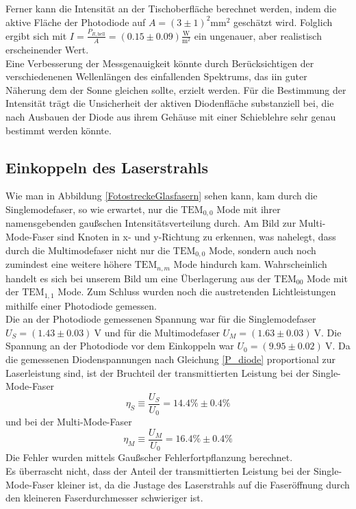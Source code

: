 \documentclass[11pt,a4paper,oneside]{scrartcl}
\begin{document}
Ferner kann die Intensität an der Tischoberfläche berechnet werden, indem die aktive Fläche der Photodiode auf $A=(3\pm1)^2\mathrm{mm}^2$ geschätzt wird. Folglich ergibt sich mit $I=\frac{P_{R,\mathrm{hell}}}{A}=(0.15\pm0.09)\frac{\mathrm{W}}{\mathrm m^2}$ ein ungenauer, aber realistisch erscheinender Wert. \\
Eine Verbesserung der Messgenauigkeit könnte durch Berücksichtigen der verschiedenenen Wellenlängen des einfallenden Spektrums, das iin guter Näherung dem der Sonne gleichen sollte, erzielt werden. Für die Bestimmung der Intensität trägt die Unsicherheit der aktiven Diodenfläche substanziell bei, die nach Ausbauen der Diode aus ihrem Gehäuse mit einer Schieblehre sehr genau bestimmt werden könnte.
\subsection{Einkoppeln des Laserstrahls}
Wie man in Abbildung \ref{FotostreckeGlasfasern} sehen kann, kam durch die Singlemodefaser, so wie erwartet, nur die $\mathrm{TEM}_{0,0}$ Mode mit ihrer namensgebenden gaußschen Intensitätsverteilung durch. Am Bild zur Multi-Mode-Faser sind Knoten in x- und y-Richtung zu erkennen, was nahelegt, dass durch die Multimodefaser nicht nur die $\mathrm{TEM}_{0,0}$ Mode, sondern auch noch zumindest eine weitere höhere $\mathrm{TEM}_{n,m}$  Mode hindurch kam. 
Wahrscheinlich handelt es sich bei unserem Bild um eine Überlagerung aus der $\mathrm{TEM}_{00}$ Mode mit der $\mathrm{TEM}_{1,1}$ Mode. Zum Schluss wurden noch die austretenden Lichtleistungen mithilfe einer Photodiode gemessen. \\
Die an der Photodiode gemessenen Spannung
war für die Singlemodefaser $U_S=(1.43\pm0.03)\ \mathrm V$ und für die Multimodefaser $U_M=(1.63\pm 0.03)\ \mathrm V$. Die Spannung an der Photodiode vor dem Einkoppeln war $U_0=(9.95\pm 0.02)\ \mathrm V$. Da die gemessenen Diodenspannungen nach Gleichung \ref{P_diode} proportional zur Laserleistung sind, ist der Bruchteil der transmittierten Leistung bei der Single-Mode-Faser
\begin{equation}
\eta_S\equiv \frac{U_S}{U_0}=14.4\%\pm0.4\%
\end{equation}
und bei der Multi-Mode-Faser
\begin{equation}
\eta_M\equiv \frac{U_M}{U_0}=16.4\%\pm0.4\%
\end{equation}
Die Fehler wurden mittels Gaußscher Fehlerfortpflanzung berechnet.\\
Es überrascht nicht, dass der Anteil der transmittierten Leistung bei der Single-Mode-Faser kleiner ist, da die Justage des Laserstrahls auf die Faseröffnung durch den kleineren Faserdurchmesser schwieriger ist.\\
\end{document}
